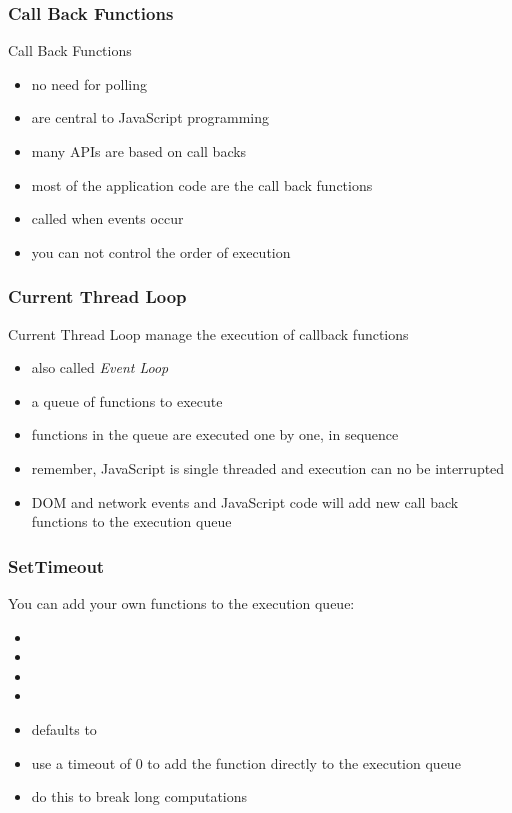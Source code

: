 \begin{frame}[fragile] \frametitle{Call Back Functions}
Call Back Functions
\begin{itemize}
  \item no need for polling
  \item are central to JavaScript programming
  \item many APIs are based on call backs
  \item most of the application code are the call back functions
  \item called when events occur
  \item you can not control the order of execution
\end{itemize}
\end{frame}

\begin{frame}[fragile] \frametitle{Current Thread Loop}
Current Thread Loop manage the execution of callback functions
\begin{itemize}
  \item also called \emph{Event Loop}
  \item a queue of functions to execute
  \item functions in the queue are executed one by one, in sequence
  \item remember, JavaScript is single threaded and execution can no be interrupted
  \item DOM and network events and JavaScript code will add new call back functions to the execution queue
\end{itemize}
\end{frame}

\begin{frame}[fragile] \frametitle{SetTimeout}
You can add your own functions to the execution queue:
\begin{itemize}
  \item {}
  \item {}
  \item {}
  \item {}
  \item {} defaults to 
  \item use a timeout of 0 to add the function directly to the execution queue
  \item do this to break long computations
\end{itemize}
\end{frame}

